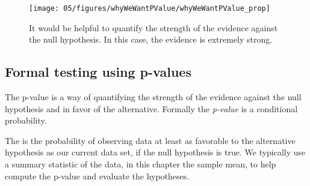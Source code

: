 \begin{figure}[hht]
\centering
\texttt{[image: 05/figures/whyWeWantPValue/whyWeWantPValue\_prop]}
\caption{It would be helpful to quantify the strength of the evidence against the null hypothesis. In this case, the evidence is extremely strong.}
\label{whyWeWantPValue_prop}
\end{figure}


\subsection{Formal testing using p-values}
\label{pValue}


The p-value is a way of quantifying the strength of the evidence against the null hypothesis and in favor of the alternative. Formally the \emph{p-value} is a conditional probability.

\begin{termBox}{
The  is the probability of observing data at least as favorable to the alternative hypothesis as our current data set, if the null hypothesis is true. We typically use a summary statistic of the data, in this chapter the sample mean, to help compute the p-value and evaluate the hypotheses.}
\end{termBox}


